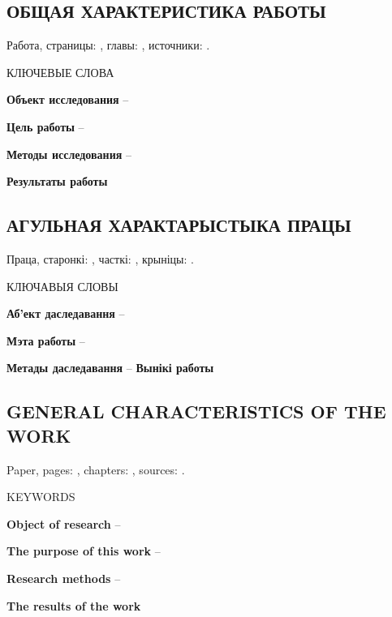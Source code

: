 \newpage
\begin{center}
    \section*{ОБЩАЯ ХАРАКТЕРИСТИКА РАБОТЫ}
\end{center}

Работа, страницы: \pageref{LastPage}, главы: , источники: .

КЛЮЧЕВЫЕ СЛОВА

\phantom{}

\textbf{Объект исследования} --

\textbf{Цель работы} -- 

\textbf{Методы исследования} --

\textbf{Результаты работы}

\newpage
\begin{center}
    \section*{АГУЛЬНАЯ ХАРАКТАРЫСТЫКА ПРАЦЫ}
\end{center}

Праца, старонкі: \pageref{LastPage}, часткі: , крыніцы: .

КЛЮЧАВЫЯ СЛОВЫ

\phantom{}

\textbf{Аб'ект даследавання} --

\textbf{Мэта работы} --

\textbf{Метады даследавання} --
\textbf{Вынікі работы}

\newpage
\begin{center}
    \section*{GENERAL CHARACTERISTICS OF THE WORK}
\end{center}

Paper, pages: \pageref{LastPage}, chapters: , sources: .

KEYWORDS

\phantom{}

\textbf{Object of research} --

\textbf{The purpose of this work} --

\textbf{Research methods} --

\textbf{The results of the work}
